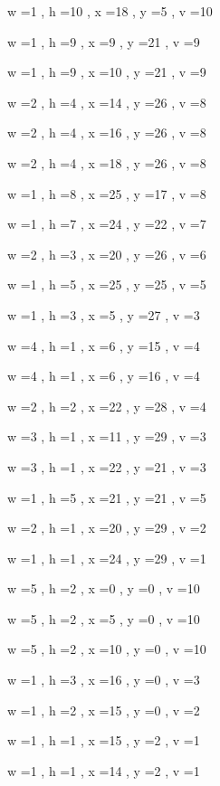 \documentclass[11pt]{article}
\begin{document}
\par
w =1 , h =10 , x =18 , y =5 , v =10
\par
w =1 , h =9 , x =9 , y =21 , v =9
\par
w =1 , h =9 , x =10 , y =21 , v =9
\par
w =2 , h =4 , x =14 , y =26 , v =8
\par
w =2 , h =4 , x =16 , y =26 , v =8
\par
w =2 , h =4 , x =18 , y =26 , v =8
\par
w =1 , h =8 , x =25 , y =17 , v =8
\par
w =1 , h =7 , x =24 , y =22 , v =7
\par
w =2 , h =3 , x =20 , y =26 , v =6
\par
w =1 , h =5 , x =25 , y =25 , v =5
\par
w =1 , h =3 , x =5 , y =27 , v =3
\par
w =4 , h =1 , x =6 , y =15 , v =4
\par
w =4 , h =1 , x =6 , y =16 , v =4
\par
w =2 , h =2 , x =22 , y =28 , v =4
\par
w =3 , h =1 , x =11 , y =29 , v =3
\par
w =3 , h =1 , x =22 , y =21 , v =3
\par
w =1 , h =5 , x =21 , y =21 , v =5
\par
w =2 , h =1 , x =20 , y =29 , v =2
\par
w =1 , h =1 , x =24 , y =29 , v =1
\par
\newpage




w =5 , h =2 , x =0 , y =0 , v =10
\par
w =5 , h =2 , x =5 , y =0 , v =10
\par
w =5 , h =2 , x =10 , y =0 , v =10
\par
w =1 , h =3 , x =16 , y =0 , v =3
\par
w =1 , h =2 , x =15 , y =0 , v =2
\par
w =1 , h =1 , x =15 , y =2 , v =1
\par
w =1 , h =1 , x =14 , y =2 , v =1
\par
\newpage
\end{document}
